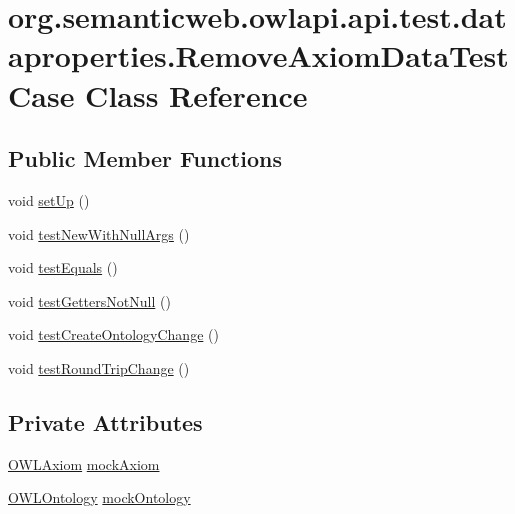 \hypertarget{classorg_1_1semanticweb_1_1owlapi_1_1api_1_1test_1_1dataproperties_1_1_remove_axiom_data_test_case}{\section{org.\-semanticweb.\-owlapi.\-api.\-test.\-dataproperties.\-Remove\-Axiom\-Data\-Test\-Case Class Reference}
\label{classorg_1_1semanticweb_1_1owlapi_1_1api_1_1test_1_1dataproperties_1_1_remove_axiom_data_test_case}
}
\subsection*{Public Member Functions}
\begin{DoxyCompactItemize}
\item 
void \hyperlink{classorg_1_1semanticweb_1_1owlapi_1_1api_1_1test_1_1dataproperties_1_1_remove_axiom_data_test_case_a3b825fe70bccaed492d92c5bb1e3ac4d}{set\-Up} ()
\item 
void \hyperlink{classorg_1_1semanticweb_1_1owlapi_1_1api_1_1test_1_1dataproperties_1_1_remove_axiom_data_test_case_a0361f470bf173531661a0aebf41554f0}{test\-New\-With\-Null\-Args} ()
\item 
void \hyperlink{classorg_1_1semanticweb_1_1owlapi_1_1api_1_1test_1_1dataproperties_1_1_remove_axiom_data_test_case_a30a1a767b581461468b592294e7f007e}{test\-Equals} ()
\item 
void \hyperlink{classorg_1_1semanticweb_1_1owlapi_1_1api_1_1test_1_1dataproperties_1_1_remove_axiom_data_test_case_aaf7f2c8617af8d6f9d258c5b41dc328b}{test\-Getters\-Not\-Null} ()
\item 
void \hyperlink{classorg_1_1semanticweb_1_1owlapi_1_1api_1_1test_1_1dataproperties_1_1_remove_axiom_data_test_case_a121f58ecee3d858d385f5c025c421d66}{test\-Create\-Ontology\-Change} ()
\item 
void \hyperlink{classorg_1_1semanticweb_1_1owlapi_1_1api_1_1test_1_1dataproperties_1_1_remove_axiom_data_test_case_a5b634b8db2fe66d9d5b86bd6b8eb05e8}{test\-Round\-Trip\-Change} ()
\end{DoxyCompactItemize}
\subsection*{Private Attributes}
\begin{DoxyCompactItemize}
\item 
\hyperlink{interfaceorg_1_1semanticweb_1_1owlapi_1_1model_1_1_o_w_l_axiom}{O\-W\-L\-Axiom} \hyperlink{classorg_1_1semanticweb_1_1owlapi_1_1api_1_1test_1_1dataproperties_1_1_remove_axiom_data_test_case_afce5b07d28fbd12f70dd54ee045c6d94}{mock\-Axiom}
\item 
\hyperlink{interfaceorg_1_1semanticweb_1_1owlapi_1_1model_1_1_o_w_l_ontology}{O\-W\-L\-Ontology} \hyperlink{classorg_1_1semanticweb_1_1owlapi_1_1api_1_1test_1_1dataproperties_1_1_remove_axiom_data_test_case_a1357f026522a7d81e5332caa613d0405}{mock\-Ontology}
\end{DoxyCompactItemize}


